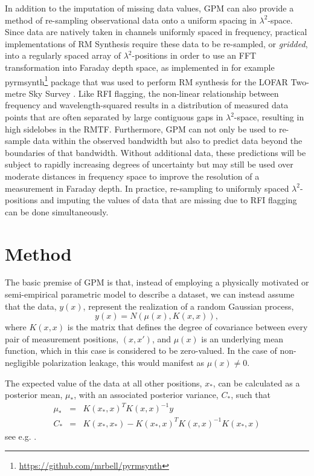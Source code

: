 \documentclass[fleqn,usenatbib]{mnras}
\begin{document}
In addition to the imputation of missing data values, GPM can also provide a method of re-sampling observational data onto a uniform spacing in $\lambda^2$-space. Since data are natively taken in channels uniformly spaced in frequency, practical implementations of RM Synthesis require these data to be re-sampled, or {\it gridded}, into a regularly spaced array of $\lambda^2$-positions in order to use an FFT transformation into Faraday depth space, as implemented in for example {\sc pyrmsynth}\footnote{\url{https://github.com/mrbell/pyrmsynth}} package that was used to perform RM synthesis for the LOFAR Two-metre Sky Survey \citep{lofarpyrmsynth}. Like RFI flagging, the non-linear relationship between frequency and wavelength-squared results in a distribution of measured data points that are often separated by large contiguous gaps in $\lambda^2$-space, resulting in high sidelobes in the RMTF. Furthermore, GPM can not only be used to re-sample data within the observed bandwidth but also to predict data beyond the boundaries of that bandwidth. Without additional data, these predictions will be subject to rapidly increasing degrees of uncertainty but may still be used over moderate distances in frequency space to improve the resolution of a measurement in Faraday depth. In practice, re-sampling to uniformly spaced $\lambda^2$-positions and imputing the values of data that are missing due to RFI flagging can be done simultaneously.


\section{Method}
\label{sec:method}

The basic premise of GPM is that, instead of employing a physically motivated or semi-empirical parametric model to describe a dataset, we can instead assume that the data, $y(x)$, represent the realization of a random Gaussian process,
%
\begin{equation}
y(x) = N(\mu(x), K(x,x)),
\end{equation}
%
where $K(x,x)$ is the matrix that defines the degree of covariance between every pair of measurement positions, $(x,x')$, and $\mu(x)$ is an underlying mean function, which in this case is considered to be zero-valued. In the case of non-negligible polarization leakage, this would manifest as $\mu(x)\neq 0$.

The expected value of the data at all other positions, $x_{\ast}$, can be calculated as a posterior mean, $\mu_{\ast}$, with an associated posterior variance, $C_{\ast}$, such that
%
\begin{eqnarray}
\label{eq:postmu} \mu_{\ast} &=&  K(x_{\ast},x)^T K(x,x)^{-1} y  \\
\label{eq:postcov} C_{\ast} &=&  K(x_{\ast},x_{\ast}) - K(x_{\ast},x)^T K(x,x)^{-1} K(x_{\ast},x)
\end{eqnarray}
%
see e.g. \cite{3569, article}.
\end{document}
